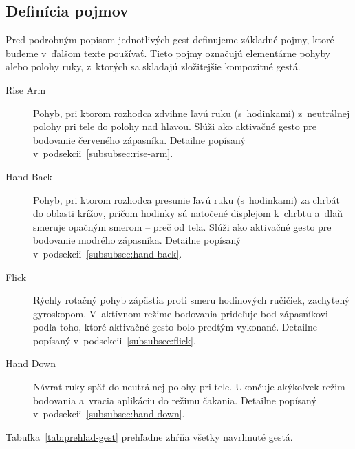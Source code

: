 \subsection{Definícia pojmov}
\label{subsection:definicia-pojmov}

Pred podrobným popisom jednotlivých gest definujeme základné pojmy, ktoré budeme v~ďalšom texte
používať. Tieto pojmy označujú elementárne pohyby alebo polohy ruky, z~ktorých sa skladajú
zložitejšie kompozitné gestá.

\begin{description}
  \item[Rise Arm] Pohyb, pri ktorom rozhodca zdvihne ľavú ruku (s~hodinkami) z~neutrálnej polohy
        pri tele do polohy nad hlavou. Slúži ako aktivačné gesto pre
        bodovanie červeného zápasníka. Detailne popísaný v~podsekcii~\ref{subsubsec:rise-arm}.

  \item[Hand Back] Pohyb, pri ktorom rozhodca presunie ľavú ruku (s~hodinkami) za chrbát
        do oblasti krížov, pričom hodinky sú natočené displejom k~chrbtu a~dlaň
        smeruje opačným smerom -- preč od tela. Slúži ako aktivačné gesto pre
        bodovanie modrého zápasníka. Detailne popísaný
        v~podsekcii~\ref{subsubsec:hand-back}.

  \item[Flick] Rýchly rotačný pohyb zápästia proti smeru hodinových ručičiek, zachytený
        gyroskopom. V~aktívnom režime bodovania prideľuje bod zápasníkovi podľa toho, ktoré
        aktivačné gesto bolo predtým vykonané. Detailne popísaný
        v~podsekcii~\ref{subsubsec:flick}.

  \item[Hand Down] Návrat ruky späť do neutrálnej polohy pri tele. Ukončuje akýkoľvek režim
        bodovania a~vracia aplikáciu do režimu čakania. Detailne popísaný
        v~podsekcii~\ref{subsubsec:hand-down}.
\end{description}

Tabuľka~\ref{tab:prehlad-gest} prehľadne zhŕňa všetky navrhnuté gestá.

